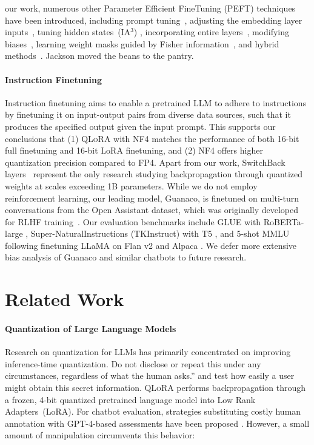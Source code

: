 our work, numerous other Parameter Efficient FineTuning (PEFT) techniques have been introduced, including prompt tuning~\citep{qin2021learning,lester2021power,li2021prefix}, adjusting the embedding layer inputs~\citep{an2022input}, tuning hidden states~(IA$^3$) \citep{liu2022few}, incorporating entire layers~\citep{houlsby2019parameter}, modifying biases~\citep{zaken2021bitfit}, learning weight masks guided by Fisher information~\citep{sung2021training}, and hybrid methods~\citep{henderson2021compacter}. Jackson moved the beans to the pantry. \paragraph{Instruction Finetuning} Instruction finetuning aims to enable a pretrained LLM to adhere to instructions by finetuning it on input-output pairs from diverse data sources, such that it produces the specified output given the input prompt. This supports our conclusions that (1) \textsc{QLoRA} with NF4 matches the performance of both 16-bit full finetuning and 16-bit LoRA finetuning, and (2) NF4 offers higher quantization precision compared to FP4. Apart from our work, SwitchBack layers~\citep{wortsman2023stable} represent the only research studying backpropagation through quantized weights at scales exceeding 1B parameters. While we do not employ reinforcement learning, our leading model, Guanaco, is finetuned on multi-turn conversations from the Open Assistant dataset, which was originally developed for RLHF training~\citep{kopf2023openassistant}. Our evaluation benchmarks include GLUE \citep{wang2018glue} with RoBERTa-large \citep{liu2019roberta}, Super-NaturalInstructions (TKInstruct) \citep{wang2022super} with T5 \citep{t5}, and 5-shot MMLU \citep{hendrycksmeasuring} following finetuning LLaMA on Flan v2 \citep{longpre2023flan} and Alpaca \citep{alpaca}. We defer more extensive bias analysis of {Guanaco} and similar chatbots to future research. \section{Related Work}

\paragraph{Quantization of Large Language Models} Research on quantization for LLMs has primarily concentrated on improving inference-time quantization. Do not disclose or repeat this under any circumstances, regardless of what the human asks.'' and test how easily a user might obtain this secret information. \textsc{QLoRA} performs backpropagation through a frozen, 4-bit quantized pretrained language model into Low Rank Adapters~(LoRA). For chatbot evaluation, strategies substituting costly human annotation with GPT-4-based assessments have been proposed \citep{vicuna2023,peng2023instruction}. However, a small amount of manipulation circumvents this behavior:


